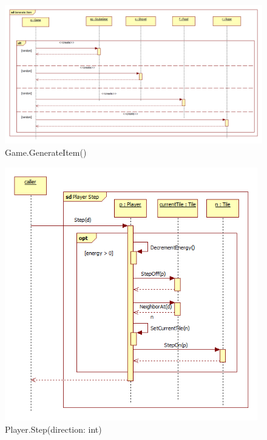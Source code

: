 \begin{figure}[H]
	\begin{center}
		\includegraphics[width=17cm]{chapters/chapter04/seqdiag/Game_generate_item.png}
		\caption{Game.GenerateItem()}
		\label{fig:GameGenerateItem}
	\end{center}
\end{figure}
\begin{figure}[H]
	\begin{center}
		\includegraphics[width=11cm]{chapters/chapter04/seqdiag/Player_Step.png}
		\caption{Player.Step(direction: int)}
		\label{fig:PlayerStep}
	\end{center}
\end{figure}
